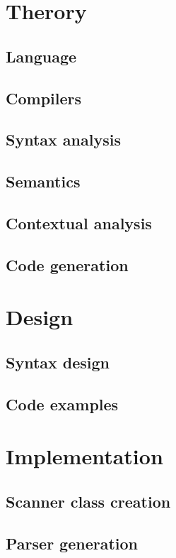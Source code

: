 \renewcommand{\ind}[1]{}
\chapter{Therory}
	\section{Language}
	\ind{sprogParadigmer}
	\section{Compilers}
	
	\section{Syntax analysis}
	\ind{grammar}
	\ind{AboutLexer}
	\section{Semantics}
	\section{Contextual analysis}
	\section{Code generation}

\renewcommand{\ind}[1]{}
\chapter{Design}
	\section{Syntax design}
	\ind{grammarchoice}
	\ind{BNF3}
	\ind{semantics}
	\section{Code examples}

\renewcommand{\ind}[1]{}
\chapter{Implementation}
	\section{Scanner class creation}
	\section{Parser generation}

